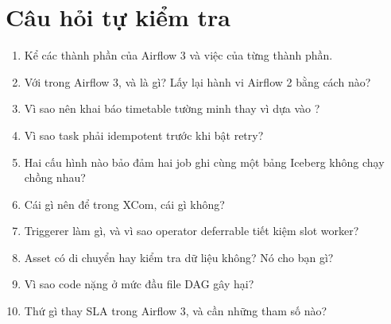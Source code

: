 \section{Câu hỏi tự kiểm tra}
\begin{enumerate}
  \item Kể các thành phần của Airflow 3 và việc của từng thành phần.
  \item Với  trong Airflow 3,  và  là gì? Lấy lại hành vi Airflow 2 bằng cách nào?
  \item Vì sao nên khai báo timetable tường minh thay vì dựa vào ?
  \item Vì sao task phải idempotent trước khi bật retry?
  \item Hai cấu hình nào bảo đảm hai job ghi cùng một bảng Iceberg không chạy chồng nhau?
  \item Cái gì nên để trong XCom, cái gì không?
  \item Triggerer làm gì, và vì sao operator deferrable tiết kiệm slot worker?
  \item Asset có di chuyển hay kiểm tra dữ liệu không? Nó cho bạn gì?
  \item Vì sao code nặng ở mức đầu file DAG gây hại?
  \item Thứ gì thay SLA trong Airflow 3, và cần những tham số nào?
\end{enumerate}

